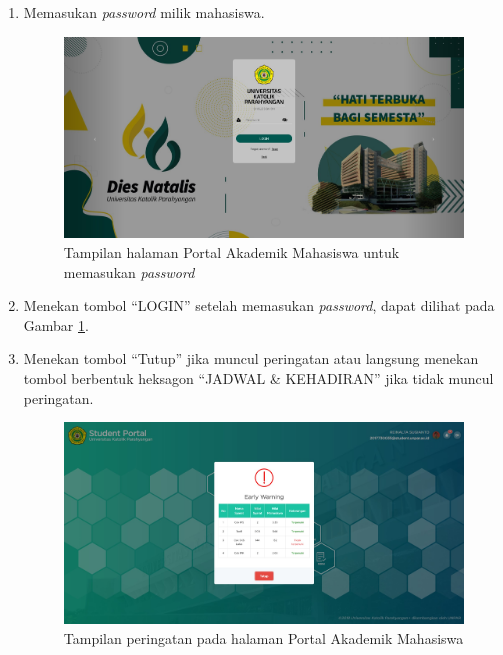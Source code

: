 \begin{enumerate}
	\item Memasukan \textit{password} milik mahasiswa.
	\begin{figure}[H]
		\centering
		\includegraphics[scale=0.225]{Gambar/pass.jpg}
		\caption{Tampilan halaman Portal Akademik Mahasiswa untuk memasukan \textit{password}} 
		\label{fig:pass}
	\end{figure}
	\item Menekan tombol ``LOGIN'' setelah memasukan \textit{password}, dapat dilihat pada Gambar \ref{fig:pass}.
	
	\item Menekan tombol ``Tutup'' jika muncul peringatan atau langsung menekan tombol berbentuk heksagon ``JADWAL \& KEHADIRAN'' jika tidak muncul peringatan.
	\begin{figure}[H]
		\centering
		\includegraphics[scale=0.225]{Gambar/notif.jpg}
		\caption{Tampilan peringatan pada halaman Portal Akademik Mahasiswa} 
		\label{fig:notif}
	\end{figure}


\end{enumerate}
